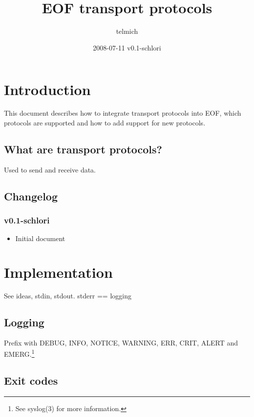 \documentclass[12pt,a4paper]{article}
\begin{document}
\title{EOF transport protocols}
\date{2008-07-11 v0.1-schlori}
\author{telmich}

\maketitle
\tableofcontents

\section{Introduction}
This document describes how to integrate transport protocols into EOF,
which protocols are supported and how to add support for new protocols.
\subsection{What are transport protocols?}
Used to send and receive data.
\subsection{Changelog}
\subsubsection{v0.1-schlori}
\begin{itemize}
\item Initial document
\end{itemize}
\section{Implementation}
See ideas, stdin, stdout. stderr == logging
\subsection{Logging}
Prefix with DEBUG, INFO, NOTICE, WARNING, ERR, CRIT, ALERT
and EMERG.\footnote{See syslog(3) for more information.}
\subsection{Exit codes}
\end{document}
